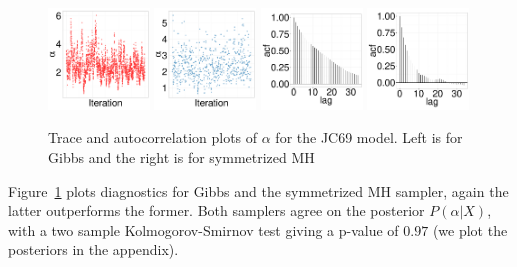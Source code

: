   \begin{figure}[H]
  \centering

  \begin{minipage}[!hp]{0.99\linewidth}
  	\centering
    \includegraphics [width=0.24\textwidth, angle=0]{figs/JC_ks/jc_traceGBS_44_05_3_.pdf}
    \includegraphics [width=0.24\textwidth, angle=0]{figs/JC_ks/jc_traceMH_44_05_3_.pdf}
    \includegraphics [width=0.24\textwidth, angle=0]{figs/JC_ks/jc_gbsacf_44_05_3_.pdf}
    \includegraphics [width=0.24\textwidth, angle=0]{figs/JC_ks/jc_mhacf_44_05_3_.pdf}
  \end{minipage}
    \caption{Trace and autocorrelation plots of $\alpha$ for the JC69 model. Left is for Gibbs and the right is for symmetrized MH }
    \label{fig:ACC_JC_m}
  \end{figure}
  Figure~\ref{fig:ACC_JC_m} plots diagnostics for Gibbs and the symmetrized MH sampler, again the latter outperforms the former. 
  Both samplers agree on the posterior $P(\alpha|X)$, with a
  two sample Kolmogorov-Smirnov test giving a p-value of $ 0.97$ (we plot the posteriors in the appendix). 

